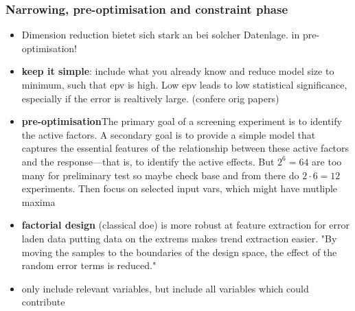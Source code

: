 \subsubsection{Narrowing, pre-optimisation and constraint phase}
\begin{itemize}
    \item Dimension reduction bietet sich stark an bei solcher Datenlage. in pre-optimisation!
    \item \textbf{keep it simple}: include what you already know and reduce model size to minimum, such that \gls{epv} is high.  Low \gls{epv} leads to low statistical significance, especially if the error is realtively large. (confere orig papers)
    \item \textbf{pre-optimisation}{The primary goal of a screening experiment is to identify the active factors. A secondary goal is to provide a simple model that captures the essential features of the relationship between these active factors and the response—that is, to identify the active effects. \cite{miller2001using}} But $2^6=64$ are too many for preliminary test so maybe check base and from there do $2\cdot6=12$ experiments. Then focus on selected input vars, which might have mutliple maxima \\ 
    \item \textbf{factorial design} (classical \gls{doe}) is more robust at feature extraction for error laden data \cite{giunta2003overview} putting data on the extrems makes trend extraction easier. "By moving the samples to the boundaries of the design space, the effect of the random error terms is reduced."
    \item only include relevant variables\cite{gunst2009fractional}, but include all variables which could contribute\cite{haertler2014statistisch}

\end{itemize}
